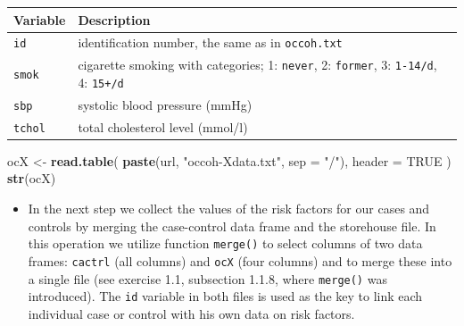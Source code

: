 \documentclass[
]{book}
\newenvironment{Shaded}{\begin{snugshade}}{\end{snugshade}}
\newcommand{\AttributeTok}[1]{\textcolor[rgb]{0.13,0.29,0.53}{#1}}
\newcommand{\ConstantTok}[1]{\textcolor[rgb]{0.56,0.35,0.01}{#1}}
\newcommand{\FunctionTok}[1]{\textcolor[rgb]{0.13,0.29,0.53}{\textbf{#1}}}
\newcommand{\NormalTok}[1]{#1}
\newcommand{\OtherTok}[1]{\textcolor[rgb]{0.56,0.35,0.01}{#1}}
\newcommand{\StringTok}[1]{\textcolor[rgb]{0.31,0.60,0.02}{#1}}
\newcounter{none} %
\providecommand{\tightlist}{%
  \setlength{\itemsep}{0pt}\setlength{\parskip}{0pt}}
\begin{document}
{\def\LTcaptype{none} %
\begin{longtable}[]{@{}
  >{\raggedright\arraybackslash}p{}
  >{\raggedright\arraybackslash}p{}@{}}
\toprule\noalign{}
\begin{minipage}[b]{\linewidth}\raggedright
Variable
\end{minipage} & \begin{minipage}[b]{\linewidth}\raggedright
Description
\end{minipage} \\
\midrule\noalign{}
\endhead
\bottomrule\noalign{}
\endlastfoot
\texttt{id} & identification number, the same as in \texttt{occoh.txt} \\
\texttt{smok} & cigarette smoking with categories; 1: \texttt{never}, 2: \texttt{former}, 3: \texttt{1-14/d}, 4: \texttt{15+/d} \\
\texttt{sbp} & systolic blood pressure (mmHg) \\
\texttt{tchol} & total cholesterol level (mmol/l) \\
\end{longtable}
}

\begin{Shaded}
\begin{Highlighting}[]
\NormalTok{ocX }\OtherTok{\textless{}{-}} 
  \FunctionTok{read.table}\NormalTok{(}
    \FunctionTok{paste}\NormalTok{(url, }\StringTok{"occoh{-}Xdata.txt"}\NormalTok{, }\AttributeTok{sep =} \StringTok{"/"}\NormalTok{), }\AttributeTok{header =} \ConstantTok{TRUE}
\NormalTok{  )}
\FunctionTok{str}\NormalTok{(ocX)}
\end{Highlighting}
\end{Shaded}

\begin{itemize}
\tightlist
\item
  In the next step we collect the values of the risk factors
  for our cases and controls by merging the case-control data frame and
  the storehouse file.
  In this operation we utilize function \texttt{merge()} to
  select columns of two data frames: \texttt{cactrl}
  (all columns) and \texttt{ocX} (four columns) and to merge
  these into a single file (see exercise 1.1, subsection 1.1.8, where
  \texttt{merge()} was introduced).
  The \texttt{id} variable in both files is used as the key to link each
  individual case or control with his own data on risk factors.
\end{itemize}
\end{document}
